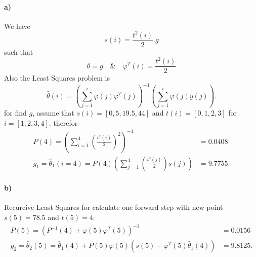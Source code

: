 \paragraph{a)} {
We have
    \begin{equation*}
        s(i)=\frac{t^2(i)}{2}.g
    \end{equation*}
such that
    \begin{equation*}
        \theta = g \quad \& \quad \varphi^T(i)=\frac{t^2(i)}{2}
    \end{equation*}
Also the Least Squares problem is
    \begin{equation} \label{eq.2}
        \hat{\theta}(i) = \left(\sum_{j=1}^{i}\varphi(j)\varphi^T(j)\right)^{-1}\left(\sum_{j=1}^{i}\varphi(j)y(j)\right).
    \end{equation}
for find $g$, assume that $s(i)=[0,5,19.5,44]$ and $t(i)=[0,1,2,3]$ for $i=[1,2,3,4]$. therefor
\begin{align}
    P(4) = \left(\sum_{i=1}^{4}\left(\frac{t^2(i)}{2}\right)^2\right)^{-1} &= 0.0408\nonumber\\
    g_1=\hat{\theta}_1(i=4)= P(4)\left(\sum_{j=1}^{4}\left(\frac{t^2(j)}{2}\right)s(j)\right) &= 9.7755.
\end{align}
}
\paragraph{b)} {
    Recurcive Least Squares for calculate one forward step with new point $s(5)=78.5$ and $t(5)=4$:
    \begin{align}
        P(5) = \left(P^{-1}(4) + \varphi(5)\varphi^T(5)\right)^{-1} &= 0.0156\nonumber\\
        g_2 = \hat{\theta}_2(5) = \hat{\theta}_1(4) + P(5)\varphi(5)\left(s(5) - \varphi^T(5)\hat{\theta}_1(4)\right) &= 9.8125.
    \end{align}
}